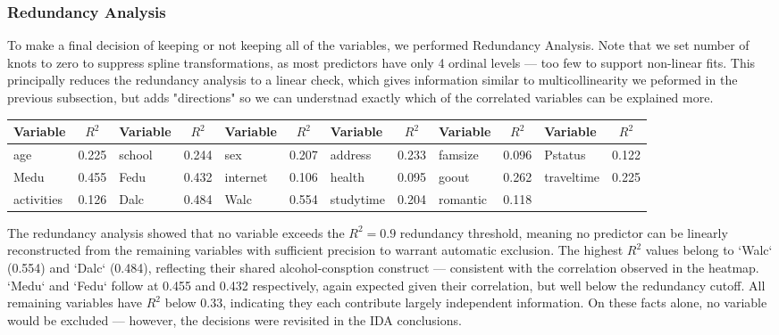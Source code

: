 \documentclass{article}
\begin{document}
\subsubsection*{Redundancy Analysis}

To make a final decision of keeping or not keeping all of the variables, we performed Redundancy Analysis.
Note that we set number of knots to zero to suppress spline transformations, as most predictors have only 4 ordinal levels --- too few to support non-linear fits. This principally reduces the redundancy analysis to a linear check, which gives information similar to multicollinearity we peformed in the previous subsection, but adds "directions" so we can understnad exactly which of the correlated variables can be explained more.

\vspace{0.5em} \noindent
\begin{tabularx}{\textwidth}{lC lC lC lC lC lC}
\hline
Variable & $R^2$ & Variable & $R^2$ & Variable & $R^2$ & Variable & $R^2$ & Variable & $R^2$ & Variable & $R^2$ \\
\hline
age        & 0.225 & school    & 0.244 & sex       & 0.207 & address   & 0.233 & famsize   & 0.096 & Pstatus    & 0.122 \\
Medu       & 0.455 & Fedu      & 0.432 & internet  & 0.106 & health    & 0.095 & goout     & 0.262 & traveltime & 0.225 \\
activities & 0.126 & Dalc      & 0.484 & Walc      & 0.554 & studytime & 0.204 & romantic  & 0.118 &           &       \\
\hline
\end{tabularx}

\vspace{0.5em}
The redundancy analysis showed that no variable exceeds the $R^2 = 0.9$ redundancy threshold, meaning no predictor can be linearly reconstructed from the remaining variables with sufficient precision to warrant automatic exclusion. The highest $R^2$ values belong to `Walc` (0.554) and `Dalc` (0.484), reflecting their shared alcohol-consption construct --- consistent with the correlation observed in the heatmap. `Medu` and `Fedu` follow at 0.455 and 0.432 respectively, again expected given their correlation, but well below the redundancy cutoff. All remaining variables have $R^2$ below 0.33, indicating they each contribute largely independent information. On these facts alone, no variable would be excluded --- however, the decisions were revisited in the IDA conclusions.
\end{document}

